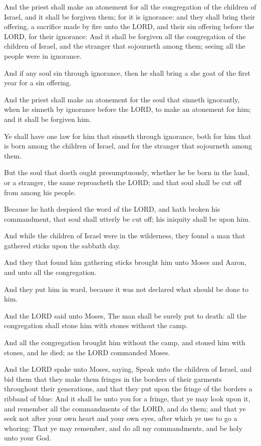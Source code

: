 \verse And the priest shall make an atonement for all the congregation
of the children of Israel, and it shall be forgiven them; for it is
ignorance: and they shall bring their offering, a sacrifice made by
fire unto the LORD, and their sin offering before the LORD, for their
ignorance: \verse And it shall be forgiven all the congregation of the
children of Israel, and the stranger that sojourneth among them;
seeing all the people were in ignorance.

\verse And if any soul sin through ignorance, then he shall bring a she
goat of the first year for a sin offering.

\verse And the priest shall make an atonement for the soul that sinneth
ignorantly, when he sinneth by ignorance before the LORD, to make an
atonement for him; and it shall be forgiven him.

\verse Ye shall have one law for him that sinneth through ignorance,
both for him that is born among the children of Israel, and for the
stranger that sojourneth among them.

\verse But the soul that doeth ought presumptuously, whether he be born
in the land, or a stranger, the same reproacheth the LORD; and that
soul shall be cut off from among his people.

\verse Because he hath despised the word of the LORD, and hath broken
his commandment, that soul shall utterly be cut off; his iniquity
shall be upon him.

\verse And while the children of Israel were in the wilderness, they
found a man that gathered sticks upon the sabbath day.

\verse And they that found him gathering sticks brought him unto Moses
and Aaron, and unto all the congregation.

\verse And they put him in ward, because it was not declared what
should be done to him.

\verse And the LORD said unto Moses, The man shall be surely put to
death: all the congregation shall stone him with stones without the
camp.

\verse And all the congregation brought him without the camp, and
stoned him with stones, and he died; as the LORD commanded Moses.

\verse And the LORD spake unto Moses, saying, \verse Speak unto the
children of Israel, and bid them that they make them fringes in the
borders of their garments throughout their generations, and that they
put upon the fringe of the borders a ribband of blue: \verse And it
shall be unto you for a fringe, that ye may look upon it, and remember
all the commandments of the LORD, and do them; and that ye seek not
after your own heart and your own eyes, after which ye use to go a
whoring: \verse That ye may remember, and do all my commandments, and
be holy unto your God.

